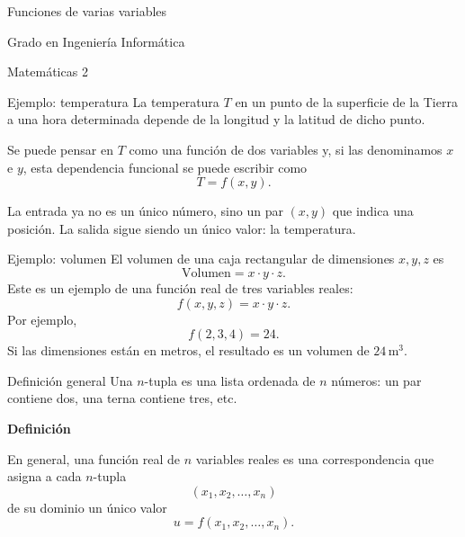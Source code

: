 


\begin{frame}{}
\centering
\LARGE Funciones de varias variables
\par\vspace{1cm}
\large Grado en Ingeniería Informática
\par Matemáticas 2
\end{frame}

\begin{frame}{Ejemplo: temperatura}
La temperatura $T$ en un punto de la superficie de la Tierra a una hora determinada depende de la longitud y la latitud de dicho punto.
\medskip

Se puede pensar en $T$ como una función de dos variables y, si las denominamos $x$ e $y$, esta dependencia funcional se puede escribir como
\[
T=f(x,y).
\]
\smallskip

La entrada ya no es un único número, sino un par $(x,y)$ que indica una posición. La salida sigue siendo un único valor: la temperatura.
\end{frame}

\begin{frame}{Ejemplo: volumen}
El volumen de una caja rectangular de dimensiones $x,y,z$ es
\[
\text{Volumen}=x\cdot y\cdot z.
\]
Este es un ejemplo de una función real de tres variables reales:
\[
f(x,y,z)=x\cdot y\cdot z.
\]
Por ejemplo,
\[
f(2,3,4)=24.
\]
Si las dimensiones están en metros, el resultado es un volumen de $24\,\mathrm{m}^3$.
\end{frame}

\begin{frame}{Definición general}
Una $n$-tupla es una lista ordenada de $n$ números: un par contiene dos, una terna contiene tres, etc.
\medskip

\textbf{Definición}
\medskip

En general, una función real de $n$ variables reales es una correspondencia que asigna a cada $n$-tupla
\[
(x_1,x_2,\ldots,x_n)
\]
de su dominio un único valor
\[
u=f(x_1,x_2,\ldots,x_n).
\]
\end{frame}

